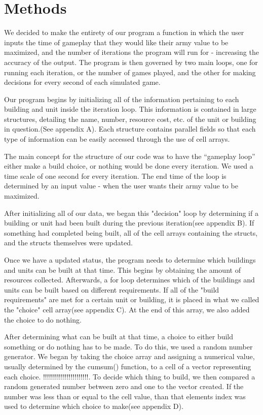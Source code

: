 \documentclass[prb,twocolumn]{revtex4}
\begin{document}
\section{Methods}

We decided to make the entirety of our program a function in which the user inputs the time of gameplay that they would like their army value to be maximized, and the number of iterations the program will run for - increasing the accuracy of the output.  The program is then governed by two main loops, one for running each iteration, or the number of games played, and the other for making decisions for every second of each simulated game.

Our program begins by initializing all of the information pertaining to each building and unit inside the iteration loop.  This information is contained in large structures, detailing the name, number, resource cost, etc. of the unit or building in question.(See appendix A).  Each structure contains parallel fields so that each type of information can be easily accessed through the use of cell arrays.

The main concept for the structure of our code was to have the ``gameplay loop'' either make a build choice, or nothing would be done every iteration.  We used a time scale of one second for every iteration. The end time of the loop is determined by an input value - when the user wants their army value to be maximized.
  
After initializing all of our data, we began this "decision" loop by determining if a building or unit had been built during the previous iteration(see appendix B).  If something had completed being built, all of the cell arrays containing the structs, and the structs themselves were updated.  

Once we have a updated status, the program needs to determine which buildings and units can be built at that time.  This begins by obtaining the amount of resources collected.  Afterwards, a for loop determines which of the buildings and units can be built based on different requirements.  If all of the "build requirements" are met for a certain unit or building, it is placed in what we called the "choice" cell array(see appendix C).  At the end of this array, we also added the choice to do nothing.

After determining what can be built at that time, a choice to either build something or do nothing has to be made.  To do this, we used a random number generator.  We began by taking the choice array and assigning a numerical value, usually determined by the cumsum() function, to a cell of a vector representing each choice.  !!!!!!!!!!!!!!!!!!!!!!!.  To decide which thing to build, we then compared a random generated number between zero and one to the vector created.  If the number was less than or equal to the cell value, than that elements index was used to determine which choice to make(see appendix D).
\end{document}

